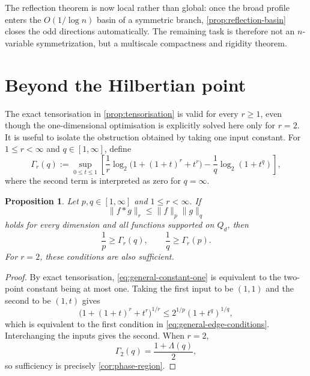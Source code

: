 \documentclass[11pt,reqno]{amsart}
\numberwithin{equation}{section}
\newtheorem{proposition}[proposition]{Proposition}
\theoremstyle{definition}
\theoremstyle{remark}
\newcommand{\Lambdaq}{\Lambda}
\newcommand{\logtwo}{\log_2}
\begin{document}
The reflection theorem is now local rather than global: once the broad
profile enters the $O(1/\log n)$ basin of a symmetric branch,
\cref{prop:reflection-basin} closes the odd directions automatically.  The
remaining task is therefore not an $n$-variable symmetrization, but a
multiscale compactness and rigidity theorem.

\section{Beyond the Hilbertian point}\label{sec:general-r}

The exact tensorisation in \cref{prop:tensorisation} is valid for every $r\ge1$, even though the one-dimensional optimisation is explicitly solved here only for $r=2$.  It is useful to isolate the obstruction obtained by taking one input constant.  For $1\le r<\infty$ and $q\in[1,\infty]$, define
\begin{equation}\label{eq:Gamma-r}
  \Gamma_r(q)
  :=\sup_{0\le t\le1}
  \left[
    \frac1r\logtwo\bigl(1+(1+t)^r+t^r\bigr)
    -\frac1q\logtwo(1+t^q)
  \right],
\end{equation}
where the second term is interpreted as zero for $q=\infty$.

\begin{proposition}\label{prop:general-edge}
Let $p,q\in[1,\infty]$ and $1\le r<\infty$.  If
\begin{equation}\label{eq:general-constant-one}
  \|f*g\|_r\le\|f\|_p\|g\|_q
\end{equation}
holds for every dimension and all functions supported on $Q_d$, then
\begin{equation}\label{eq:general-edge-conditions}
  \frac1p\ge\Gamma_r(q),
  \qquad
  \frac1q\ge\Gamma_r(p).
\end{equation}
For $r=2$, these conditions are also sufficient.
\end{proposition}

\begin{proof}
By exact tensorisation, \eqref{eq:general-constant-one} is equivalent to the two-point constant being at most one.  Taking the first input to be $(1,1)$ and the second to be $(1,t)$ gives
\[
  \bigl(1+(1+t)^r+t^r\bigr)^{1/r}
  \le2^{1/p}(1+t^q)^{1/q},
\]
which is equivalent to the first condition in \eqref{eq:general-edge-conditions}.  Interchanging the inputs gives the second.  When $r=2$,
\[
  \Gamma_2(q)=\frac{1+\Lambdaq(q)}2,
\]
so sufficiency is precisely \cref{cor:phase-region}.
\end{proof}
\end{document}
